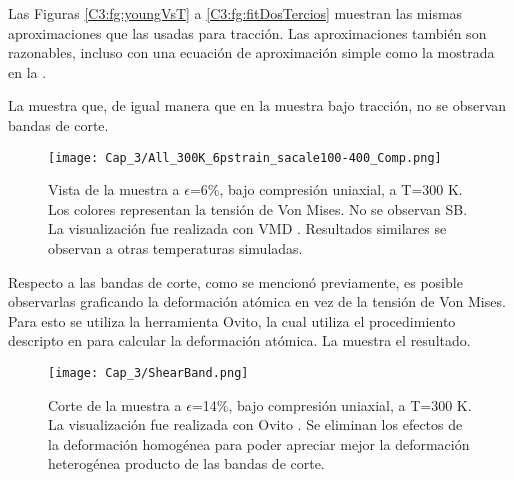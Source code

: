 
Las Figuras \ref{C3:fg:youngVsT} a \ref{C3:fg:fitDosTercios} muestran las mismas aproximaciones que las usadas para tracción. Las aproximaciones también son razonables, incluso con una ecuación de aproximación simple como la mostrada en la .


La  muestra que, de igual manera que en la muestra bajo tracción, no se observan bandas de corte.


\begin{figure}[htp]
\centering
\texttt{[image: Cap\_3/All\_300K\_6pstrain\_sacale100-400\_Comp.png]}
\caption[Vista de la muestra a $\epsilon$=6\%, bajo compresión uniaxial, a T=300 K]{Vista de la muestra a $\epsilon$=6\%, bajo compresión uniaxial, a T=300 K. Los colores representan la tensión de Von Mises. No se observan SB. La visualización fue realizada con VMD \citep{humphrey96}. Resultados similares se observan a otras temperaturas simuladas.}
\label{C3:fg:sampleComp}
\end{figure}

Respecto a las bandas de corte, como se mencionó previamente, es posible observarlas graficando la deformación atómica en vez de la tensión de Von Mises. Para esto se utiliza la herramienta Ovito, la cual utiliza el procedimiento descripto en \cite{shimizu07} para calcular la deformación atómica. La  muestra el resultado.

\begin{figure}[htp]
\centering
\texttt{[image: Cap\_3/ShearBand.png]}
\caption[Corte de la muestra a $\epsilon$=14\%, bajo compresión uniaxial, a T=300 K.]{Corte de la muestra a $\epsilon$=14\%, bajo compresión uniaxial, a T=300 K. La visualización fue realizada con Ovito \citep{stukowski10}. Se eliminan los efectos de la deformación homogénea para poder apreciar mejor la deformación heterogénea producto de las bandas de corte.}
\label{C3:fg:SBs}
\end{figure}

